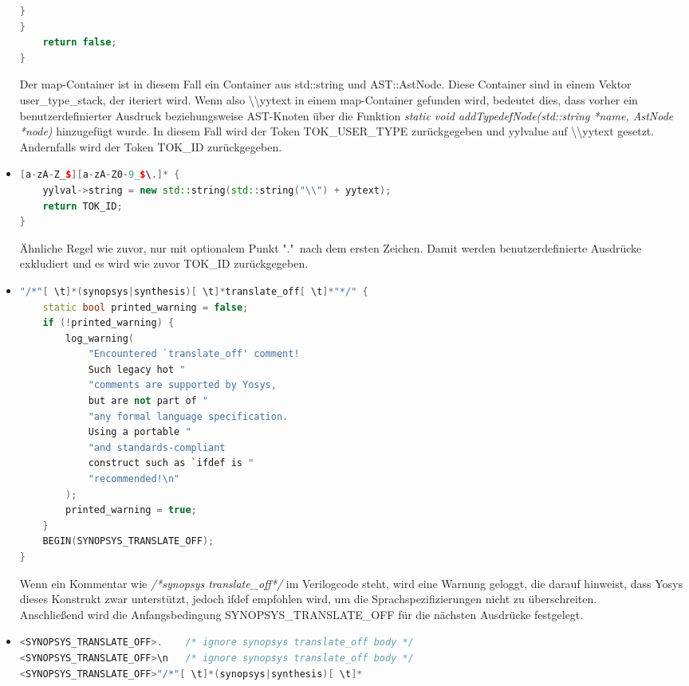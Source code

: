 \documentclass[11pt]{report}
\begin{document}
\begin{itemize}
\begin{lstlisting}[language=C++]
	}
}
	return false;
}
\end{lstlisting}
Der map-Container ist in diesem Fall ein Container aus std::string und AST::AstNode. Diese Container sind in einem Vektor user\_type\_stack, der iteriert wird. Wenn also \textbackslash \textbackslash yytext in einem map-Container gefunden wird, bedeutet dies, dass vorher ein benutzerdefinierter Ausdruck beziehungsweise AST-Knoten über die Funktion \textit{static void addTypedefNode(std::string *name, AstNode *node)} hinzugefügt wurde. In diesem Fall wird der Token TOK\_USER\_TYPE zurückgegeben und yylvalue auf \textbackslash \textbackslash yytext gesetzt. Andernfalls wird der Token TOK\_ID zurückgegeben.
\item
\begin{lstlisting}[language=C++]
[a-zA-Z_$][a-zA-Z0-9_$\.]* {
	yylval->string = new std::string(std::string("\\") + yytext);
	return TOK_ID;
}
\end{lstlisting}
Ähnliche Regel wie zuvor, nur mit optionalem Punkt "."\ nach dem ersten Zeichen. Damit werden benutzerdefinierte Ausdrücke exkludiert und es wird wie zuvor TOK\_ID zurückgegeben.
\item
\begin{lstlisting}[language=C++]
"/*"[ \t]*(synopsys|synthesis)[ \t]*translate_off[ \t]*"*/" {
	static bool printed_warning = false;
	if (!printed_warning) {
		log_warning(
			"Encountered `translate_off' comment!
			Such legacy hot "
			"comments are supported by Yosys, 
			but are not part of "
			"any formal language specification. 
			Using a portable "
			"and standards-compliant 
			construct such as `ifdef is "
			"recommended!\n"
		);
		printed_warning = true;
	}
	BEGIN(SYNOPSYS_TRANSLATE_OFF);
}
\end{lstlisting}
Wenn ein Kommentar wie \textit{/*synopsys translate\_off*/} im Verilogcode steht, wird eine Warnung geloggt, die darauf hinweist, dass Yosys dieses Konstrukt zwar unterstützt, jedoch ifdef empfohlen wird, um die Sprachspezifizierungen nicht zu überschreiten. \\
Anschließend wird die Anfangsbedingung SYNOPSYS\_TRANSLATE\_OFF für die nächsten Ausdrücke festgelegt.
\item
\begin{lstlisting}[language=C++]
<SYNOPSYS_TRANSLATE_OFF>.    /* ignore synopsys translate_off body */
<SYNOPSYS_TRANSLATE_OFF>\n   /* ignore synopsys translate_off body */
<SYNOPSYS_TRANSLATE_OFF>"/*"[ \t]*(synopsys|synthesis)[ \t]*

\end{lstlisting}
\end{itemize}
\end{document}
